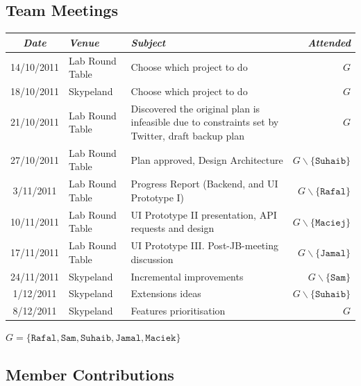 \documentclass[a4paper,12pt]{article}
\begin{document}
	
  \subsection{Team Meetings}
  \begin{tabular}{c | l p{7cm} r}
    \emph{\large Date} &  \emph{\large Venue} &  \emph{\large Subject} &  \emph{\large Attended}\\
    \hline
    14/10/2011 & Lab Round Table & Choose which project to do & \(G\)\\
    18/10/2011 & Skypeland & Choose which project to do & \(G\)\\
    21/10/2011 & Lab Round Table & Discovered the original plan is infeasible due to constraints set by Twitter, draft backup plan & \(G\)\\
    27/10/2011 & Lab Round Table & Plan approved, Design Architecture & \(G \smallsetminus \{\texttt{Suhaib}\}\)\\
    3/11/2011 & Lab Round Table & Progress Report (Backend, and UI Prototype I) & \(G \smallsetminus \{\texttt{Rafal}\}\)\\
    10/11/2011 & Lab Round Table & UI Prototype II presentation, API requests and design & \(G \smallsetminus \{\texttt{Maciej}\}\)\\
    17/11/2011 & Lab Round Table & UI Prototype III. Post-JB-meeting discussion & \(G \smallsetminus \{\texttt{Jamal}\}\)\\
    24/11/2011 & Skypeland & Incremental improvements & \(G \smallsetminus \{\texttt{Sam}\}\)\\
    1/12/2011 & Skypeland & Extensions ideas & \(G \smallsetminus \{\texttt{Suhaib}\}\)\\
    8/12/2011 & Skypeland & Features prioritisation & \(G\)\\
  \end{tabular}
  \(G=\{\texttt{Rafal}, \texttt{Sam}, \texttt{Suhaib}, \texttt{Jamal}, \texttt{Maciek}\}\)\\
	
	\subsection{Member Contributions}
\end{document}
